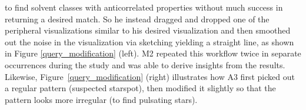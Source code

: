  to find solvent classes with anticorrelated
 properties without much success in returning a desired match.
 So he instead dragged and dropped one
 of the peripheral visualizations similar
 to his desired visualization and then smoothed
 out the noise in the visualization via sketching yielding
 a straight line,
 as shown in Figure \ref{query_modification} (left).
 M2 repeated this workflow twice in separate
 occurrences during the study and
 was able to derive insights from the results.
 Likewise, Figure~\ref{query_modification} (right)
 illustrates how A3 first picked out a regular pattern
 (suspected starspot), then modified it slightly
 so that the pattern looks more irregular (to find pulsating stars).
